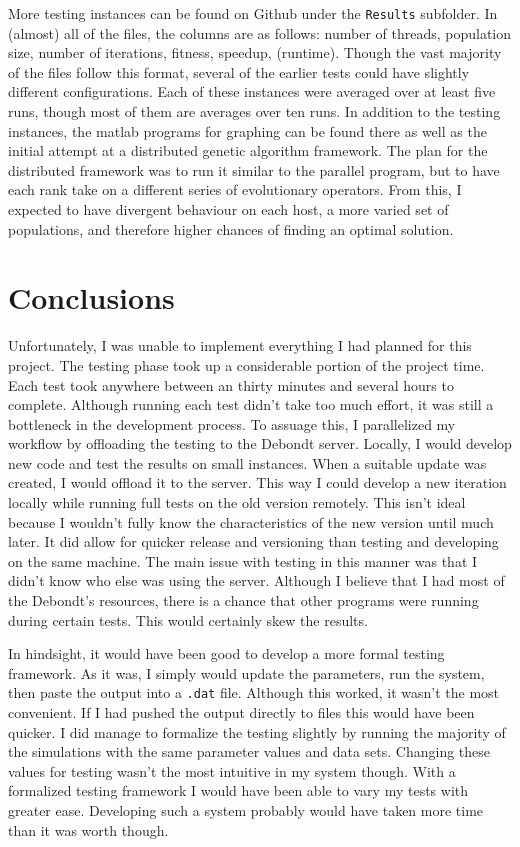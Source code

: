 \documentclass[10pt,letterpaper]{article}
\begin{document}
More testing instances can be found on Github under the \texttt{Results} subfolder. In (almost) all of the files, the columns are as follows: number of threads, population size, number of iterations, fitness, speedup, (runtime). Though the vast majority of the files follow this format, several of the earlier tests could have slightly different configurations. Each of these instances were averaged over at least five runs, though most of them are averages over ten runs. In addition to the testing instances, the matlab programs for graphing can be found there as well as the initial attempt at a distributed genetic algorithm framework. The plan for the distributed framework was to run it similar to the parallel program, but to have each rank take on a different series of evolutionary operators. From this, I expected to have divergent behaviour on each host, a more varied set of populations, and therefore higher chances of finding an optimal solution.

\section{Conclusions}
Unfortunately, I was unable to implement everything I had planned for this project. The testing phase took up a considerable portion of the project time. Each test took anywhere between an thirty minutes and several hours to complete. Although running each test didn't take too much effort, it was still a bottleneck in the development process. To assuage this, I parallelized my workflow by offloading the testing to the Debondt server. Locally, I would develop new code and test the results on small instances. When a suitable update was created, I would offload it to the server. This way I could develop a new iteration locally while running full tests on the old version remotely. This isn't ideal because I wouldn't fully know the characteristics of the new version until much later. It did allow for quicker release and versioning than testing and developing on the same machine. The main issue with testing in this manner was that I didn't know who else was using the server. Although I believe that I had most of the Debondt's resources, there is a chance that other programs were running during certain tests. This would certainly skew the results. 

In hindsight, it would have been good to develop a more formal testing framework. As it was, I simply would update the parameters, run the system, then paste the output into a \texttt{.dat} file. Although this worked, it wasn't the most convenient. If I had pushed the output directly to files this would have been quicker. I did manage to formalize the testing slightly by running the majority of the simulations with the same parameter values and data sets. Changing these values for testing wasn't the most intuitive in my system though. With a formalized testing framework I would have been able to vary my tests with greater ease. Developing such a system probably would have taken more time than it was worth though.
\end{document}
